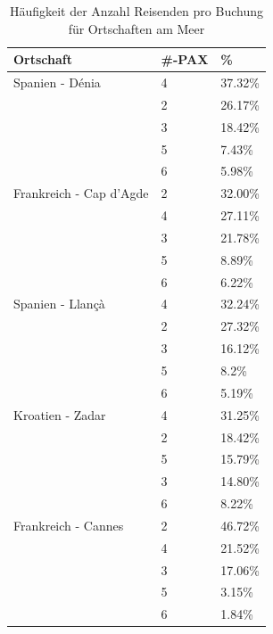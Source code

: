 \begin{table}[H] 
	\caption{Häufigkeit der Anzahl Reisenden pro Buchung für Ortschaften am Meer}
	\centering
	\label{sec:testingfazit:testing:hypothesen:2}
	\begin{tabular}{ | l | l | l | } 
		\hline 
		\rowcolor{tableheadcolor}
		\bfseries Ortschaft & \bfseries \#-PAX & \bfseries \% \\ \hline 
		Spanien - Dénia & 4 & \cellcolor{green!25}37.32\% \\ \cline{2-3} 
		 & 2 & \cellcolor{red!25}26.17\% \\ \cline{2-3}
		 & 3 & 18.42\% \\ \cline{2-3} 
		 & 5 & 7.43\% \\ \cline{2-3}
		 & 6 & 5.98\% \\ \hline 
		Frankreich - Cap d'Agde & 2 & \cellcolor{red!25}32.00\% \\ \cline{2-3} 
		 & 4 & \cellcolor{green!25}27.11\% \\ \cline{2-3}
		 & 3 & 21.78\% \\ \cline{2-3} 
		 & 5 & 8.89\% \\ \cline{2-3}
		 & 6 & 6.22\% \\ \hline 
		Spanien - Llançà & 4 & \cellcolor{green!25}32.24\% \\ \cline{2-3}
		& 2 & \cellcolor{red!25}27.32\% \\ \cline{2-3} 
		& 3 & 16.12\% \\ \cline{2-3}
		& 5 & 8.2\% \\ \cline{2-3}
		& 6 & 5.19\% \\ \hline 
		Kroatien - Zadar & 4 & \cellcolor{green!25}31.25\% \\ \cline{2-3}
		& 2 & \cellcolor{red!25}18.42\% \\ \cline{2-3} 
		& 5 & 15.79\% \\ \cline{2-3}
		& 3 & 14.80\% \\ \cline{2-3}
		& 6 & 8.22\% \\ \hline 
		Frankreich - Cannes & 2 & \cellcolor{red!25}46.72\% \\ \cline{2-3} 
		& 4 & \cellcolor{green!25}21.52\% \\ \cline{2-3}
		& 3 & 17.06\% \\ \cline{2-3} 
		& 5 & 3.15\% \\ \cline{2-3}
		& 6 & 1.84\% \\ \hline 
	\end{tabular}
\end{table}

